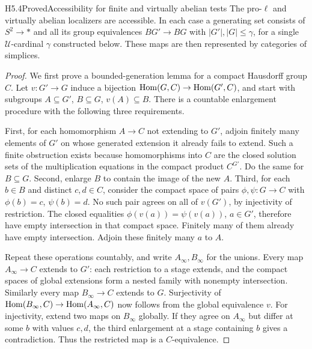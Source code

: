 \begin{claim}{H5.4}{Proved}{Accessibility for finite and virtually abelian tests}
The pro-$\ell$ and virtually abelian localizers are accessible.
In each case a generating set consists of $S^2\to *$
and all its group equivalences $BG'\to BG$ with
$|G'|,|G|\leq\gamma$, for a single
$\mathcal U$-cardinal $\gamma$ constructed below.
These maps are then represented by categories of simplices.
\end{claim}
\begin{proof}
We first prove a bounded-generation lemma for a compact
Hausdorff group $C$. Let $v:G'\to G$ induce a bijection
$\operatorname{Hom}(G,C)\to\operatorname{Hom}(G',C)$, and start with subgroups
$A\subseteq G'$, $B\subseteq G$, $v(A)\subseteq B$.
There is a countable enlargement procedure with the following
three requirements.

First, for each homomorphism $A\to C$ not extending to $G'$,
adjoin finitely many elements of $G'$ on whose generated
extension it already fails to extend. Such a finite
obstruction exists because homomorphisms into $C$ are the
closed solution sets of the multiplication equations in
the compact product $C^{G'}$. Do the same for $B\subseteq G$.
Second, enlarge $B$ to contain the image of the new $A$.
Third, for each $b\in B$ and distinct $c,d\in C$, consider
the compact space of pairs $\phi,\psi:G\to C$ with
$\phi(b)=c$, $\psi(b)=d$. No such pair agrees on all
of $v(G')$, by injectivity of restriction. The closed
equalities $\phi(v(a))=\psi(v(a))$, $a\in G'$, therefore
have empty intersection in that compact space. Finitely
many of them already have empty intersection. Adjoin
these finitely many $a$ to $A$.

Repeat these operations countably, and write
$A_\infty,B_\infty$ for the unions. Every map
$A_\infty\to C$ extends to $G'$: each restriction to
a stage extends, and the compact spaces of global
extensions form a nested family with nonempty
intersection. Similarly every map $B_\infty\to C$
extends to $G$. Surjectivity of
$\operatorname{Hom}(B_\infty,C)\to\operatorname{Hom}(A_\infty,C)$ now follows
from the global equivalence $v$. For injectivity,
extend two maps on $B_\infty$ globally. If they
agree on $A_\infty$ but differ at some $b$ with
values $c,d$, the third enlargement at a stage
containing $b$ gives a contradiction. Thus the
restricted map is a $C$-equivalence.


\end{proof}
